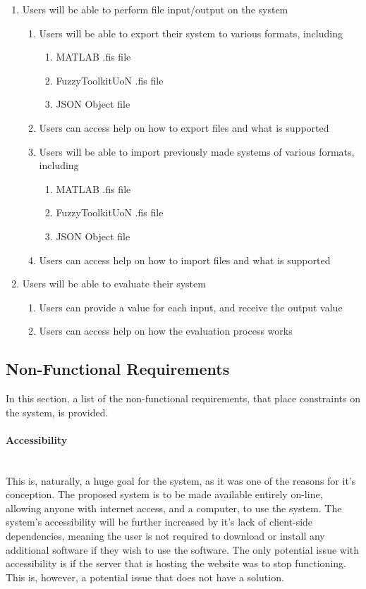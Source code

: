 \begin{enumerate}
\item Users will be able to perform file input/output on the system
	\begin{enumerate}[label*=\arabic*.]
		\item Users will be able to export their system to various formats, including	
		\begin{enumerate}[label*=\arabic*.]			
			\item MATLAB .fis file
			\item FuzzyToolkitUoN .fis file
			\item JSON Object file		
		\end{enumerate}
		\item Users can access help on how to export files and what is supported
		\item Users will be able to import previously made systems of various formats, including
		\begin{enumerate}[label*=\arabic*.]
			\item MATLAB .fis file
			\item FuzzyToolkitUoN .fis file
			\item JSON Object file	
		\end{enumerate}
		\item Users can access help on how to import files and what is supported		
	\end{enumerate}

\item Users will be able to evaluate their system
	\begin{enumerate}[label*=\arabic*.]
		\item Users can provide a value for each input, and receive the output value
		\item Users can access help on how the evaluation process works
	\end{enumerate}	
\end{enumerate}

\subsection{Non-Functional Requirements}
\label{sec:non-funcs}
In this section, a list of the non-functional requirements, that place constraints on the system, is provided.

\paragraph{Accessibility}\ \\
This is, naturally, a huge goal for the system, as it was one of the reasons for it's conception. The proposed system is to be made available entirely on-line, allowing anyone with internet access, and a computer, to use the system. The system's accessibility will be further increased by it's lack of client-side dependencies, meaning the user is not required to download or install any additional software if they wish to use the software. The only potential issue with accessibility is if the server that is hosting the website was to stop functioning. This is, however, a potential issue that does not have a solution.

